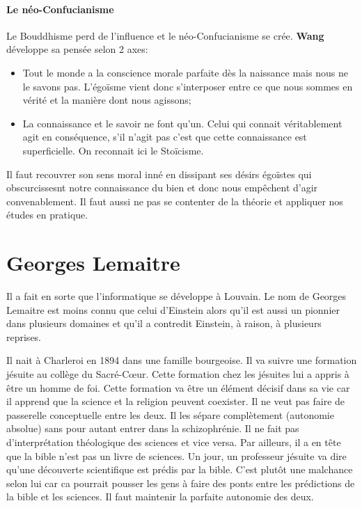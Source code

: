 \subsection{Le néo-Confucianisme}
Le Bouddhisme perd de l'influence et le néo-Confucianisme se crée.
\textbf{Wang} développe sa pensée selon 2 axes:
\begin{itemize}
	\item Tout le monde a la conscience morale parfaite dès la naissance mais nous ne le savons pas. L'égoïsme vient donc s'interposer entre ce que nous sommes en vérité et la manière dont nous agissons;
	\item La connaissance et le savoir ne font qu'un.
		Celui qui connait véritablement agit en conséquence, s'il n'agit pas c'est que cette connaissance est superficielle.
		On reconnait ici le Stoïcisme.
\end{itemize}
Il faut recouvrer son sens moral inné en dissipant ses désirs égoïstes qui obscurcissesnt notre connaissance du bien et donc nous empêchent d'agir convenablement.
Il faut aussi ne pas se contenter de la théorie et appliquer nos études en pratique.

\part{Georges Lemaitre}
Il a fait en sorte que l'informatique se développe à Louvain.
Le nom de Georges Lemaitre est moins connu que celui d'Einstein alors qu'il est aussi un pionnier dans plusieurs domaines et qu'il a contredit Einstein, à raison, à plusieurs reprises.

Il nait à Charleroi en 1894 dans une famille bourgeoise.
Il va suivre une formation jésuite au collège du Sacré-Cœur.
Cette formation chez les jésuites lui a appris à être un homme de foi.
Cette formation va être un élément décisif dans sa vie car il apprend que la science et la religion peuvent coexister.
Il ne veut pas faire de passerelle conceptuelle entre les deux.
Il les sépare complètement (autonomie absolue) sans pour autant entrer dans la schizophrénie.
Il ne fait pas d'interprétation théologique des sciences et vice versa.
Par ailleurs, il a en tête que la bible n'est pas un livre de sciences.
Un jour, un professeur jésuite va dire qu'une découverte scientifique est prédis par la bible.
C'est plutôt une malchance selon lui car ca pourrait pousser les gens à faire des ponts entre les prédictions de la bible et les sciences.
Il faut maintenir la parfaite autonomie des deux.

